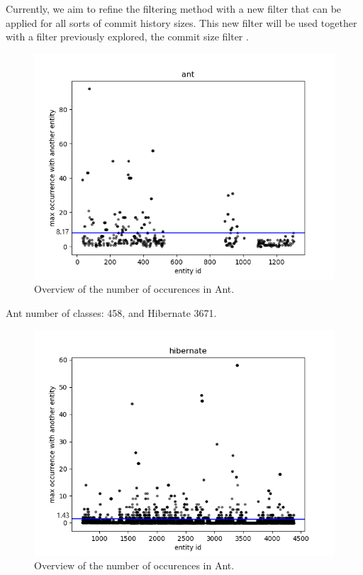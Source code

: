 \documentclass[runningheads]{comsis2}
\begin{document}
Currently, we aim to refine the filtering method with a new filter that can be applied for all sorts of commit history sizes. This new filter will be used together with a filter previously explored, the commit size filter \cite{enase19}.


\begin{figure}
\centering
\includegraphics[width=\textwidth]{fig_ant_maxOcc.png}
\caption{Overview of the number of occurences in Ant. }
\label{fig:strength_overview}
\centering
\end{figure}

Ant number of classes: 458, and Hibernate 3671.

\begin{figure}
\centering
\includegraphics[width=\textwidth]{fig_hibernate_maxOcc.png}
\caption{Overview of the number of occurences in Ant. }
\label{fig:strength_overview}
\centering
\end{figure}
\end{document}
